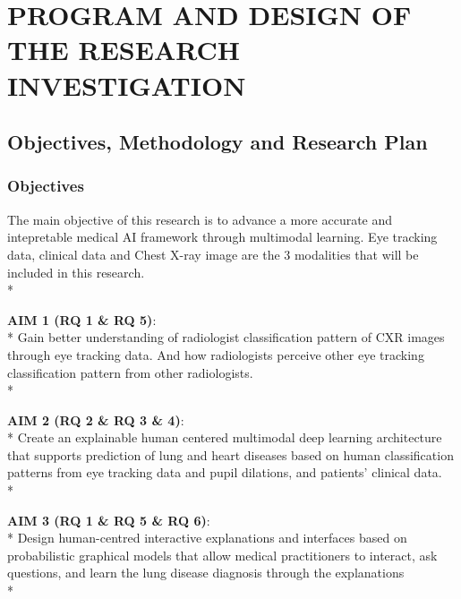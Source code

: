 \section{PROGRAM AND DESIGN OF THE RESEARCH INVESTIGATION}
\label{sec:research-design}

\subsection{Objectives, Methodology and Research Plan}

\subsubsection{Objectives}
The main objective of this research is to advance a more accurate and intepretable medical AI framework through multimodal learning. Eye tracking data, clinical data and Chest X-ray image are the 3 modalities that will be included in this research.\\*

\noindent
\textbf{AIM 1 (RQ 1 \& RQ 5)}:\\*
Gain better understanding of radiologist classification pattern of CXR images through eye tracking data. And how radiologists perceive other eye tracking classification pattern from other radiologists. \\*

\noindent
\textbf{AIM 2 (RQ 2 \& RQ 3 \& 4)}:\\*
Create an explainable human centered multimodal deep learning architecture that supports prediction of lung and heart diseases based on human classification patterns from eye tracking data and pupil dilations, and patients' clinical data.\\*


\noindent
\textbf{AIM 3 (RQ 1 \& RQ 5 \& RQ 6)}:\\*
Design human-centred interactive explanations and interfaces based on probabilistic graphical models that allow medical practitioners to interact, ask questions, and learn the lung disease diagnosis through the explanations \\*

